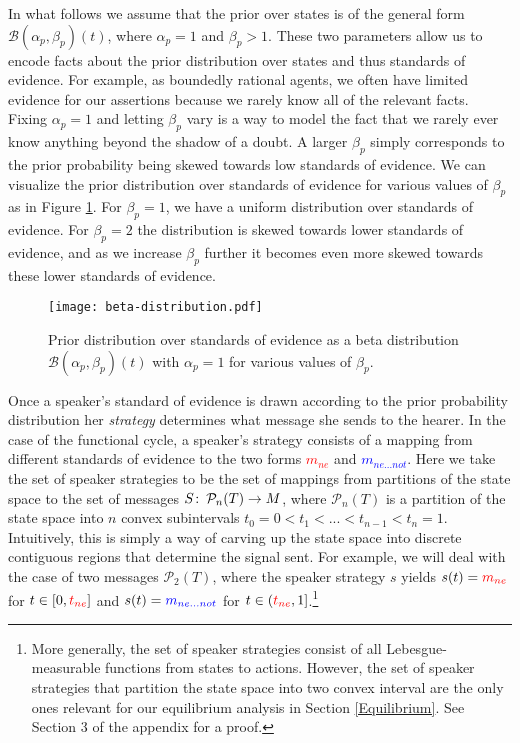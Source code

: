 \documentclass[linguex]{sp}
\theoremstyle{definition} \newtheorem{definition}{Definition}
\begin{document}
In what follows we assume that the prior over states is of the general form $\mathcal{B}(\alpha_p,\beta_p)(t)$, where $\alpha_p = 1$ and $\beta_p > 1$. These two parameters allow us to encode facts about the prior distribution over states and thus standards of evidence. For example, as boundedly rational agents, we often have limited evidence for our assertions because we rarely know all of the relevant facts. Fixing $\alpha_p=1$ and letting $\beta_p$ vary is a way to model the fact that we rarely ever know anything beyond the shadow of a doubt.  A larger $\beta_p$ simply corresponds to the prior probability being skewed towards low standards of evidence.  We can visualize the prior distribution over standards of evidence for various values of $\beta_p$ as in Figure \ref{beta}. For $\beta_p = 1$, we have a uniform distribution over standards of evidence. For $\beta_p = 2$ the distribution is skewed towards lower standards of evidence, and as we increase $\beta_p$ further it becomes even more skewed towards these lower standards of evidence. 

\begin{figure}
\begin{center}
	\texttt{[image: beta-distribution.pdf]}
	\caption{Prior distribution over standards of evidence as a beta distribution $\mathcal{B}(\alpha_p, \beta_p)(t)$  with $\alpha_p = 1$ for various values of $\beta_p$.}
	\label{beta}
\end{center}
\end{figure}

Once a speaker's standard of evidence is drawn according to the prior probability distribution her \emph{strategy} determines what message she sends to the hearer. In the case of the functional cycle, a speaker's strategy consists of a mapping from different standards of evidence to the two forms \emph{\textcolor{red}{$m_{ne}$}} and \emph{\textcolor{blue}{$m_{ne...not}$}}.  Here we take the set of speaker strategies to be the set of mappings from partitions of the state space to the set of messages $S \colon\thinspace \mathcal{P}_n(T) \rightarrow M$, where $\mathcal{P}_n(T)$ is a partition of the state space into $n$ convex subintervals $t_0 = 0 < t_1 < ... < t_{n-1} < t_n = 1$. Intuitively, this is simply a way of carving up the state space into discrete contiguous regions that determine the signal sent.  For example, we will deal with the case of two messages $\mathcal{P}_2(T)$, where the speaker  strategy $s$ yields $s(t) = \textcolor{red}{m_{ne}}$ for $t \in [0, \emph{\textcolor{red}{$t_{ne}$}}]$ and $s(t) = \textcolor{blue}{m_{ne...not}}$  for $t \in (\emph{\textcolor{red}{$t_{ne}$}}, 1]$.\footnote{More generally, the set of speaker strategies consist of all Lebesgue-measurable functions from states to actions. However, the set of speaker strategies that partition the state space into two convex interval are the only ones relevant for our equilibrium analysis in Section \ref{Equilibrium}. See Section 3 of the appendix for a proof.}    
\end{document}
